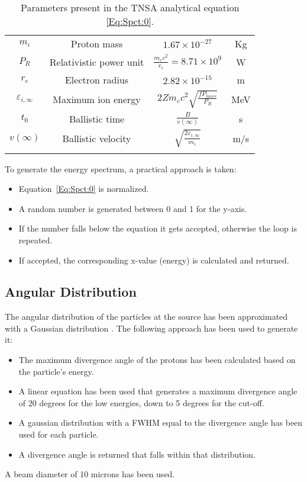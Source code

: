 \begin{itemize}
\begin{longtable}{c c c c}
       $m_{i}$ & Proton mass & $1.67 \times 10^{-27}$ & Kg \\ 
       $P_{R}$ & Relativistic power unit & $\frac{m_{e} c^{2}}{r_{e}} = 8.71 \times 10^{9}$ & W \\  
       $r_{e}$ & Electron radius & $2.82 \times 10^{-15}$ & m \\  
       $\varepsilon_{i,\infty}$ & Maximum ion energy & $2 Z m_{e} c^{2} \sqrt{\frac{f P_{laser}}{P_{R}}}$ & MeV \\  
       $t_{0}$ & Ballistic time & $\frac{B}{v(\infty)}$ & s \\  
       $v(\infty)$ & Ballistic velocity & $\sqrt{\frac{2 \varepsilon_{i,\infty}}{m_{i}}}$ & m/s \\  
      \hline
      \caption{Parameters present in the TNSA analytical equation \ref{Eq:Spct:0}.}
      \label{table:EnergySpectrumParameters}
      \end{longtable}

  \end{itemize}

  To generate the energy spectrum, a practical approach is taken:
  \begin{itemize}
    \item Equation~\ref{Eq:Spct:0} is normalized.
    \item A random number is generated between 0 and 1 for the y-axis.
    \item If the number falls below the equation it gets accepted, otherwise the loop is repeated.
    \item If accepted, the corresponding x-value (energy) is calculated and returned.
  \end{itemize}



\subsection{Angular Distribution}

The angular distribution of the particles at the source has been approximated with a Gaussian distribution \cite{10.1038/s41598-019-41705-0}. 
The following approach has been used to generate it:

\begin{itemize}
  \item The maximum divergence angle of the protons has been calculated based on the particle's energy.
  \item A linear equation has been used that generates a maximum divergence angle of 20 degrees for the low energies, down to 5 degrees for the cut-off.
  \item A gaussian distribution with a FWHM equal to the divergence angle has been used for each particle. 
  \item A divergence angle is returned that falls within that distribution.
\end{itemize}

A beam diameter of 10 microns has been used.